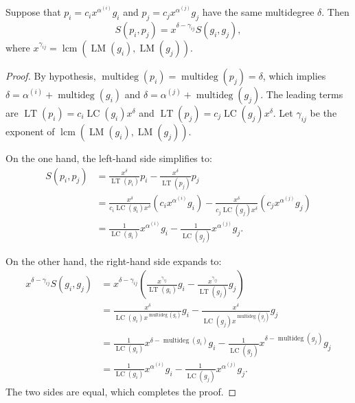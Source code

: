 \begin{lemma}\label{lem:sPolynomial_monomial_mul} %
  \mathlibok 
  Suppose that $p_i = c_i x^{\alpha^{(i)}} g_i$ and $p_j = c_j x^{\alpha^{(j)}} g_j$ have the same multidegree $\delta$. Then
  \[
  S(p_i, p_j) = x^{\delta - \gamma_{ij}} S(g_i, g_j),
  \]
  where $x^{\gamma_{ij}} = \operatorname{lcm}(\operatorname{LM}(g_i), \operatorname{LM}(g_j))$.
\end{lemma}
\begin{proof}
  \mathlibok
  By hypothesis, $\operatorname{multideg}(p_i) = \operatorname{multideg}(p_j) = \delta$, which implies $\delta = \alpha^{(i)} + \operatorname{multideg}(g_i)$ and $\delta = \alpha^{(j)} + \operatorname{multideg}(g_j)$.
  The leading terms are $\operatorname{LT}(p_i) = c_i \operatorname{LC}(g_i) x^\delta$ and $\operatorname{LT}(p_j) = c_j \operatorname{LC}(g_j) x^\delta$.
  Let $\gamma_{ij}$ be the exponent of $\operatorname{lcm}(\operatorname{LM}(g_i), \operatorname{LM}(g_j))$.

  On the one hand, the left-hand side simplifies to:
  \begin{align*}
  S(p_i, p_j) &= \frac{x^\delta}{\operatorname{LT}(p_i)} p_i - \frac{x^\delta}{\operatorname{LT}(p_j)} p_j \\
  &= \frac{x^\delta}{c_i \operatorname{LC}(g_i) x^\delta} (c_i x^{\alpha^{(i)}} g_i) - \frac{x^\delta}{c_j \operatorname{LC}(g_j) x^\delta} (c_j x^{\alpha^{(j)}} g_j) \\
  &= \frac{1}{\operatorname{LC}(g_i)} x^{\alpha^{(i)}} g_i - \frac{1}{\operatorname{LC}(g_j)} x^{\alpha^{(j)}} g_j.
  \end{align*}

  On the other hand, the right-hand side expands to:
  \begin{align*}
  x^{\delta - \gamma_{ij}} S(g_i, g_j)
  &= x^{\delta - \gamma_{ij}} \left( \frac{x^{\gamma_{ij}}}{\operatorname{LT}(g_i)} g_i - \frac{x^{\gamma_{ij}}}{\operatorname{LT}(g_j)} g_j \right) \\
  &= \frac{x^{\delta}}{\operatorname{LC}(g_i)x^{\operatorname{multideg}(g_i)}} g_i - \frac{x^{\delta}}{\operatorname{LC}(g_j)x^{\operatorname{multideg}(g_j)}} g_j \\
  &= \frac{1}{\operatorname{LC}(g_i)} x^{\delta - \operatorname{multideg}(g_i)} g_i - \frac{1}{\operatorname{LC}(g_j)} x^{\delta - \operatorname{multideg}(g_j)} g_j \\
  &= \frac{1}{\operatorname{LC}(g_i)} x^{\alpha^{(i)}} g_i - \frac{1}{\operatorname{LC}(g_j)} x^{\alpha^{(j)}} g_j.
  \end{align*}
  The two sides are equal, which completes the proof.
\end{proof}

